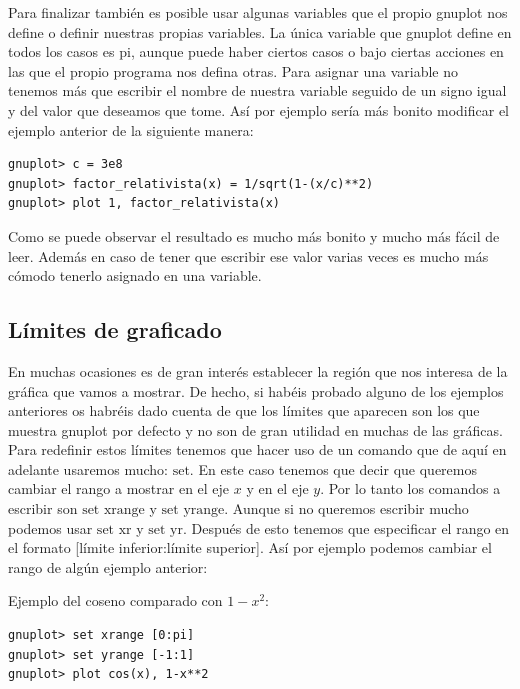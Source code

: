 \documentclass[11pt,a4paper,twoside,pdf]{article}
\numberwithin{equation}{section}
\begin{document}
Para finalizar también es posible usar algunas variables que el propio gnuplot nos define o definir nuestras propias variables. La única variable que gnuplot define en todos los casos es $\text{pi}$, aunque puede haber ciertos casos o bajo ciertas acciones en las que el propio programa nos defina otras. Para asignar una variable no tenemos más que escribir el nombre de nuestra variable seguido de un signo igual y del valor que deseamos que tome. Así por ejemplo sería más bonito modificar el ejemplo anterior de la siguiente manera:

\begin{lstlisting}[language=Gnuplot]
gnuplot> c = 3e8
gnuplot> factor_relativista(x) = 1/sqrt(1-(x/c)**2)
gnuplot> plot 1, factor_relativista(x)
\end{lstlisting}

Como se puede observar el resultado es mucho más bonito y mucho más fácil de leer. Además en caso de tener que escribir ese valor varias veces es mucho más cómodo tenerlo asignado en una variable.

\subsection{Límites de graficado}

En muchas ocasiones es de gran interés establecer la región que nos interesa de la gráfica que vamos a mostrar. De hecho, si habéis probado alguno de los ejemplos anteriores os habréis dado cuenta de que los límites que aparecen son los que muestra gnuplot por defecto y no son de gran utilidad en muchas de las gráficas. \\

Para redefinir estos límites tenemos que hacer uso de un comando que de aquí en adelante usaremos mucho: $\text{set}$. En este caso tenemos que decir que queremos cambiar el rango a mostrar en el eje $x$ y en el eje $y$. Por lo tanto los comandos a escribir son $\text{set xrange}$ y $\text{set yrange}$. Aunque si no queremos escribir mucho podemos usar $\text{set xr}$ y $\text{set yr}$. Después de esto tenemos que especificar el rango en el formato [límite inferior:límite superior]. Así por ejemplo podemos cambiar el rango de algún ejemplo anterior:

Ejemplo del coseno comparado con $1-x^2$:

\begin{lstlisting}[language=Gnuplot]
gnuplot> set xrange [0:pi]
gnuplot> set yrange [-1:1]
gnuplot> plot cos(x), 1-x**2
\end{lstlisting}
\end{document}

